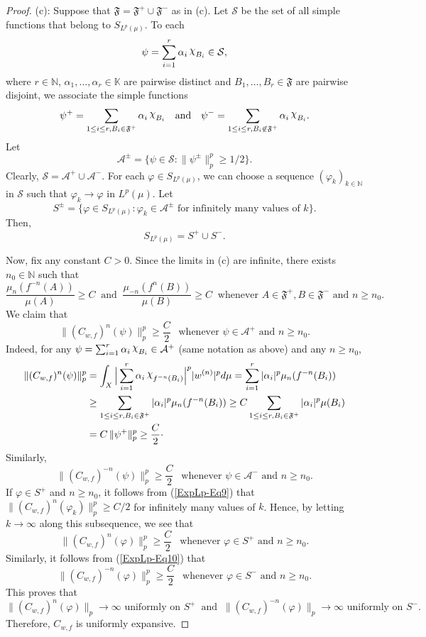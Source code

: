 \documentclass[12pt]{article}
\theoremstyle{plain}
\theoremstyle{definition}
\newcommand{\N}{\mathbb{N}} %
\newcommand{\K}{\mathbb{K}} %
\newcommand{\cA}{\mathcal{A}}
\newcommand{\cS}{\mathcal{S}}
\newcommand{\fF}{\mathfrak{F}}
\DeclareRobustCommand{\rchi}{{\mathpalette\irchi\relax}}
\newcommand{\irchi}[2]{\raisebox{\depth}{$#1\chi$}}
\begin{document}
\begin{proof}
(c): Suppose that $\fF = \fF^{+} \cup \fF^{-}$ as in (c).
Let $\cS$ be the set of all simple functions that belong to $S_{L^p(\mu)}$. To each
\[
\psi = \sum_{i=1}^r \alpha_i\, \rchi_{B_i} \in \cS,
\]
where $r \in \N$, $\alpha_1,\ldots,\alpha_r \in \K$ are pairwise distinct and $B_1,\ldots,B_r \in \fF$ are pairwise disjoint, 
we associate the simple functions
\[
\psi^+ = \sum_{1 \leq i \leq r, B_i \in \fF^+} \alpha_i\, \rchi_{B_i} \ \ \text{ and } \ \ 
\psi^- = \sum_{1 \leq i \leq r, B_i \not\in \fF^+} \alpha_i\, \rchi_{B_i}.
\]
Let
\[
\cA^\pm = \{\psi \in \cS : \|\psi^\pm\|_p^p \geq 1/2\}.
\]
Clearly, $\cS = \cA^+ \cup \cA^-$. For each $\varphi \in S_{L^p(\mu)}$, we can choose a sequence 
$(\varphi_k)_{k \in \N}$ in $\cS$ such that $\varphi_k \to \varphi$ in $L^p(\mu)$. Let
\[
S^\pm = \{\varphi \in S_{L^p(\mu)} : \varphi_k \in \cA^\pm \text{ for infinitely many values of } k\}.
\]
Then,
\[
S_{L^p(\mu)} = S^+ \cup S^-.
\]

Now, fix any constant $C > 0$. Since the limits in (c) are infinite, there exists $n_0 \in \N$ such that
\[
\frac{\mu_n(f^{-n}(A))}{\mu(A)} \geq C \ \text{ and } \ \frac{\mu_{-n}(f^n(B))}{\mu(B)} \geq C 
  \ \text{ whenever } A \in \fF^+, B \in \fF^- \text{ and } n \geq n_0.
\]
We claim that
\begin{equation}\label{ExpLp-Eq9}
\|(C_{w,f})^n(\psi)\|_p^p \geq \frac{C}{2} \ \ \text{ whenever } \psi \in \cA^+ \text{ and } n \geq n_0.
\end{equation}
Indeed, for any $\psi = \sum_{i=1}^r \alpha_i\, \rchi_{B_i} \in \cA^+$ (same notation as above) and any $n \geq n_0$, 
\begin{align*}
\|(C_{w,f})^n(\psi)\|_p^p 
  &= \int_X \Big|\sum_{i=1}^r \alpha_i\, \rchi_{f^{-n}(B_i)}\Big|^p |w^{(n)}|^p d\mu
  = \sum_{i=1}^r |\alpha_i|^p \mu_n(f^{-n}(B_i))\\
  &\geq \sum_{1 \leq i \leq r, B_i \in \fF^+} |\alpha_i|^p \mu_n(f^{-n}(B_i))
  \geq C \sum_{1 \leq i \leq r, B_i \in \fF^+} |\alpha_i|^p \mu(B_i)\\
  &= C\, \|\psi^+\|_p^p \geq \frac{C}{2}\cdot
\end{align*}
Similarly,
\begin{equation}\label{ExpLp-Eq10}
\|(C_{w,f})^{-n}(\psi)\|_p^p \geq \frac{C}{2} \ \ \text{ whenever } \psi \in \cA^- \text{ and } n \geq n_0.
\end{equation}
If $\varphi \in S^+$ and $n \geq n_0$, it follows from (\ref{ExpLp-Eq9}) that
$\|(C_{w,f})^n(\varphi_k)\|_p^p \geq C/2$ for infinitely many values of $k$.
Hence, by letting $k \to \infty$ along this subsequence, we see that
\[
\|(C_{w,f})^n(\varphi)\|_p^p \geq \frac{C}{2} \ \ \text{ whenever } \varphi \in S^+ \text{ and } n \geq n_0.
\]
Similarly,  it follows from (\ref{ExpLp-Eq10}) that
\[
\|(C_{w,f})^{-n}(\varphi)\|_p^p \geq \frac{C}{2} \ \ \text{ whenever } \varphi \in S^- \text{ and } n \geq n_0.
\]
This proves that 
\[
\|(C_{w,f})^n(\varphi)\|_p \to \infty \text{ uniformly on } S^+ \ \text{ and } \ 
\|(C_{w,f})^{-n}(\varphi)\|_p \to \infty \text{ uniformly on } S^-.
\]
Therefore, $C_{w,f}$ is uniformly expansive.


\end{proof}
\end{document}
